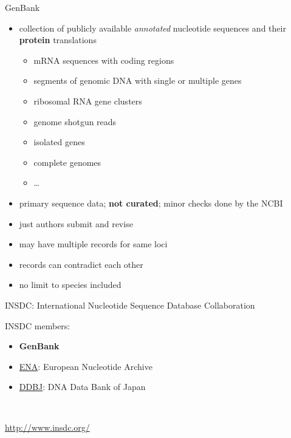 \begin{frame}{GenBank}

\begin{itemize}
\itemsep1pt\parskip0pt
\item
  collection of publicly available \emph{annotated} nucleotide sequences
  and their \textbf{protein} translations

  \begin{itemize}
  \itemsep1pt\parskip0pt
  \item
    mRNA sequences with coding regions
  \item
    segments of genomic DNA with single or multiple genes
  \item
    ribosomal RNA gene clusters
  \item
    genome shotgun reads
  \item
    isolated genes
  \item
    complete genomes
  \item
    \ldots{}
  \end{itemize}
\item
  primary sequence data; \textbf{not curated}; minor checks done by the
  NCBI
\item
  just authors submit and revise
\item
  may have multiple records for same loci
\item
  records can contradict each other
\item
  no limit to species included
\end{itemize}

\end{frame}

\begin{frame}{INSDC: International Nucleotide Sequence Database
Collaboration}

INSDC members:

\begin{itemize}
\itemsep1pt\parskip0pt
\item
  \textbf{GenBank}
\item
  \href{http://www.ebi.ac.uk/ena/}{ENA}: European Nucleotide Archive
\item
  \href{http://www.ddbj.nig.ac.jp/}{DDBJ}: DNA Data Bank of Japan
\end{itemize}

~

\url{http://www.insdc.org/}

\end{frame}

